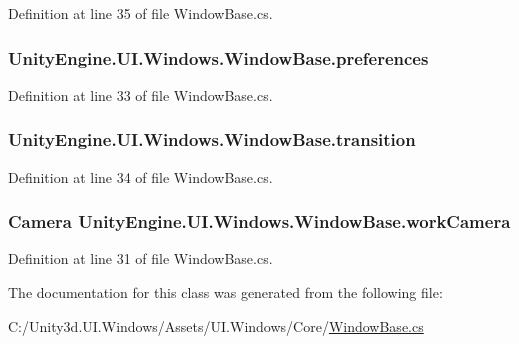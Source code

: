 Definition at line 35 of file Window\+Base.\+cs.

\hypertarget{class_unity_engine_1_1_u_i_1_1_windows_1_1_window_base_a7c74809d23787abcc881dc6854445901}{}
\subsubsection[{preferences}]{ Unity\+Engine.\+U\+I.\+Windows.\+Window\+Base.\+preferences}\label{class_unity_engine_1_1_u_i_1_1_windows_1_1_window_base_a7c74809d23787abcc881dc6854445901}


Definition at line 33 of file Window\+Base.\+cs.

\hypertarget{class_unity_engine_1_1_u_i_1_1_windows_1_1_window_base_a43b6f33af24b9cac722fd76c6536277f}{}
\subsubsection[{transition}]{ Unity\+Engine.\+U\+I.\+Windows.\+Window\+Base.\+transition}\label{class_unity_engine_1_1_u_i_1_1_windows_1_1_window_base_a43b6f33af24b9cac722fd76c6536277f}


Definition at line 34 of file Window\+Base.\+cs.

\hypertarget{class_unity_engine_1_1_u_i_1_1_windows_1_1_window_base_aa93dccb3de920a0e06ba97de7ae2e4dc}{}
\subsubsection[{work\+Camera}]{\setlength{\rightskip}{0pt plus 5cm}Camera Unity\+Engine.\+U\+I.\+Windows.\+Window\+Base.\+work\+Camera}\label{class_unity_engine_1_1_u_i_1_1_windows_1_1_window_base_aa93dccb3de920a0e06ba97de7ae2e4dc}


Definition at line 31 of file Window\+Base.\+cs.



The documentation for this class was generated from the following file\+:\begin{DoxyCompactItemize}
\item 
C\+:/\+Unity3d.\+U\+I.\+Windows/\+Assets/\+U\+I.\+Windows/\+Core/\hyperlink{_window_base_8cs}{Window\+Base.\+cs}\end{DoxyCompactItemize}
